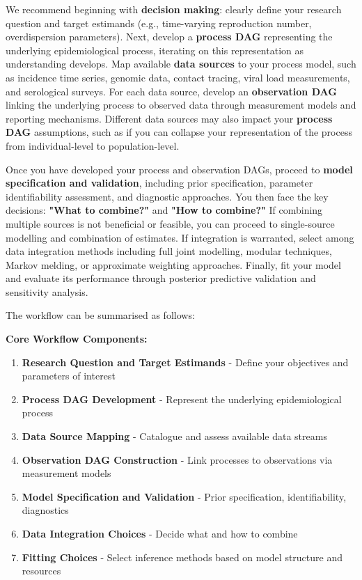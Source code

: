 \documentclass{article}
\begin{document}
We recommend beginning with \textbf{decision making}: clearly define your research question and target estimands (e.g., time-varying reproduction number, overdispersion parameters).
Next, develop a \textbf{process DAG} representing the underlying epidemiological process, iterating on this representation as understanding develops.
Map available \textbf{data sources} to your process model, such as incidence time series, genomic data, contact tracing, viral load measurements, and serological surveys.
For each data source, develop an \textbf{observation DAG} linking the underlying process to observed data through measurement models and reporting mechanisms.
Different data sources may also impact your \textbf{process DAG} assumptions, such as if you can collapse your representation of the process from individual-level to population-level.

Once you have developed your process and observation DAGs, proceed to \textbf{model specification and validation}, including prior specification, parameter identifiability assessment, and diagnostic approaches.
You then face the key decisions: \textbf{"What to combine?"} and \textbf{"How to combine?"}
If combining multiple sources is not beneficial or feasible, you can proceed to single-source modelling and combination of estimates.
If integration is warranted, select among data integration methods including full joint modelling, modular techniques, Markov melding, or approximate weighting approaches.
Finally, fit your model and evaluate its performance through posterior predictive validation and sensitivity analysis.

The workflow can be summarised as follows:

\textbf{Core Workflow Components:}
\begin{enumerate}
    \item \textbf{Research Question and Target Estimands} - Define your objectives and parameters of interest
    \item \textbf{Process DAG Development} - Represent the underlying epidemiological process
    \item \textbf{Data Source Mapping} - Catalogue and assess available data streams
    \item \textbf{Observation DAG Construction} - Link processes to observations via measurement models
    \item \textbf{Model Specification and Validation} - Prior specification, identifiability, diagnostics
    \item \textbf{Data Integration Choices} - Decide what and how to combine
    \item \textbf{Fitting Choices} - Select inference methods based on model structure and resources
\end{enumerate}
\end{document}
